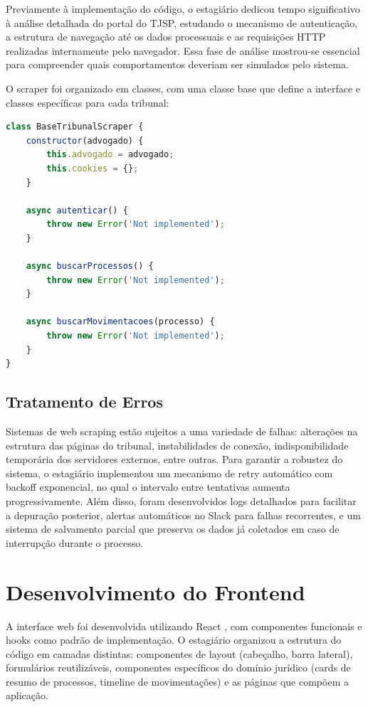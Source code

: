 \documentclass[
	12pt,
	oneside,
	a4paper,
	brazil,
	sumario=tradicional
]{abntex2}
\begin{document}
Previamente à implementação do código, o estagiário dedicou tempo significativo à análise detalhada do portal do TJSP, estudando o mecanismo de autenticação, a estrutura de navegação até os dados processuais e as requisições HTTP realizadas internamente pelo navegador. Essa fase de análise mostrou-se essencial para compreender quais comportamentos deveriam ser simulados pelo sistema.

O scraper foi organizado em classes, com uma classe base que define a interface e classes específicas para cada tribunal:

\begin{lstlisting}[language=JavaScript, caption=Estrutura básica do scraper]
class BaseTribunalScraper {
    constructor(advogado) {
        this.advogado = advogado;
        this.cookies = {};
    }

    async autenticar() {
        throw new Error('Not implemented');
    }

    async buscarProcessos() {
        throw new Error('Not implemented');
    }

    async buscarMovimentacoes(processo) {
        throw new Error('Not implemented');
    }
}
\end{lstlisting}

\subsection{Tratamento de Erros}

Sistemas de web scraping estão sujeitos a uma variedade de falhas: alterações na estrutura das páginas do tribunal, instabilidades de conexão, indisponibilidade temporária dos servidores externos, entre outras. Para garantir a robustez do sistema, o estagiário implementou um mecanismo de retry automático com backoff exponencial, no qual o intervalo entre tentativas aumenta progressivamente. Além disso, foram desenvolvidos logs detalhados para facilitar a depuração posterior, alertas automáticos no Slack para falhas recorrentes, e um sistema de salvamento parcial que preserva os dados já coletados em caso de interrupção durante o processo.

\section{Desenvolvimento do Frontend}

A interface web foi desenvolvida utilizando React \cite{react_docs}, com componentes funcionais e hooks como padrão de implementação. O estagiário organizou a estrutura do código em camadas distintas: componentes de layout (cabeçalho, barra lateral), formulários reutilizáveis, componentes específicos do domínio jurídico (cards de resumo de processos, timeline de movimentações) e as páginas que compõem a aplicação.
\end{document}
